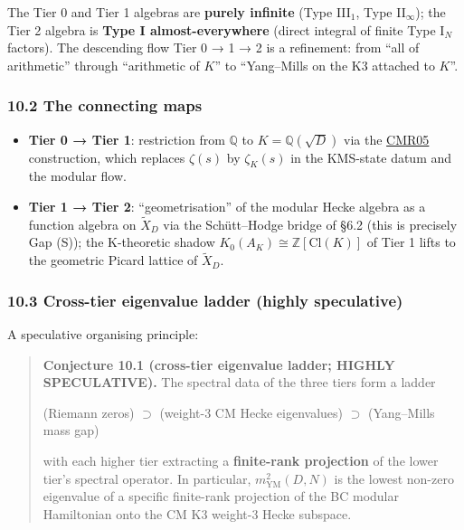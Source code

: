 \documentclass[
  11pt,
  a4paper,
]{amsart}
\providecommand{\tightlist}{\setlength{\itemsep}{0pt}\setlength{\parskip}{0pt}}
\providecommand{\tightlist}{%
  \setlength{\itemsep}{0pt}\setlength{\parskip}{0pt}}
\begin{document}
The Tier 0 and Tier 1 algebras are \textbf{purely infinite} (Type III\(_1\), Type
II\(_\infty\)); the Tier 2 algebra is \textbf{Type I almost-everywhere} (direct
integral of finite Type I\(_N\) factors). The descending flow Tier 0 → 1 → 2 is
a refinement: from ``all of arithmetic'' through ``arithmetic of \(K\)'' to ``Yang--Mills
on the K3 attached to \(K\)''.

\hypertarget{the-connecting-maps}{%
\subsubsection{10.2 The connecting maps}\label{the-connecting-maps}}

\begin{itemize}
\tightlist
\item
  \textbf{Tier 0 → Tier 1}: restriction from \(\mathbb{Q}\) to \(K = \mathbb{Q}(\sqrt{D})\)
  via the \href{Connes–Marcolli–Ramachandran\%20BC\%20system\%20for\%20imaginary\%20quadratic}{CMR05} construction, which replaces \(\zeta(s)\) by \(\zeta_K(s)\) in the
  KMS-state datum and the modular flow.
\item
  \textbf{Tier 1 → Tier 2}: ``geometrisation'' of the modular Hecke algebra as a
  function algebra on \(\widetilde{X}_D\) via the Schütt--Hodge bridge of §6.2
  (this is precisely Gap (S)); the K-theoretic shadow \(K_0(A_K) \cong \mathbb{Z}[\mathrm{Cl}(K)]\)
  of Tier 1 lifts to the geometric Picard lattice of \(\widetilde{X}_D\).
\end{itemize}

\hypertarget{cross-tier-eigenvalue-ladder-highly-speculative}{%
\subsubsection{10.3 Cross-tier eigenvalue ladder (highly speculative)}\label{cross-tier-eigenvalue-ladder-highly-speculative}}

A speculative organising principle:

\begin{quote}
\textbf{Conjecture 10.1 (cross-tier eigenvalue ladder; HIGHLY SPECULATIVE).}
The spectral data of the three tiers form a ladder

(Riemann zeros) \(\supset\) (weight-3 CM Hecke eigenvalues) \(\supset\) (Yang--Mills mass gap)

with each higher tier extracting a \textbf{finite-rank projection} of the lower
tier's spectral operator. In particular, \(m_{\mathrm{YM}}^2(D, N)\) is the
lowest non-zero eigenvalue of a specific finite-rank projection of the
BC modular Hamiltonian onto the CM K3 weight-3 Hecke subspace.
\end{quote}
\end{document}
